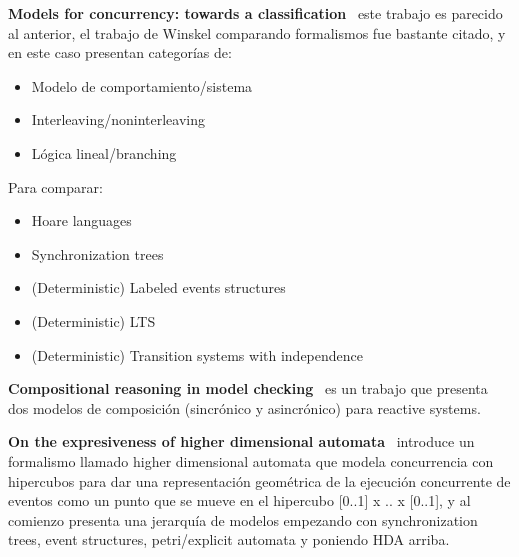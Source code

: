 \textbf{Models for concurrency: towards a classification}~\cite{sassone1996models} este trabajo es parecido al anterior, el trabajo de Winskel comparando formalismos fue bastante citado, y en este caso presentan categorías de:
\begin{itemize}
\item Modelo de comportamiento/sistema
\item Interleaving/noninterleaving
\item Lógica lineal/branching
\end{itemize}
Para comparar:
\begin{itemize}
\item Hoare languages
\item Synchronization trees
\item (Deterministic) Labeled events structures
\item (Deterministic) LTS
\item (Deterministic) Transition systems with independence
\end{itemize}

\textbf{Compositional reasoning in model checking}~\cite{berezin1997compositional} es un trabajo que presenta dos modelos de composición (sincrónico y asincrónico) para reactive systems.

\textbf{On the expresiveness of higher dimensional automata}~\cite{van2006expressiveness} introduce un formalismo llamado higher dimensional automata que modela concurrencia con hipercubos para dar una representación geométrica de la ejecución concurrente de eventos como un punto que se mueve en el hipercubo [0..1] x .. x [0..1], y al comienzo presenta una jerarquía de modelos empezando con synchronization trees, event structures, petri/explicit automata y poniendo HDA arriba.